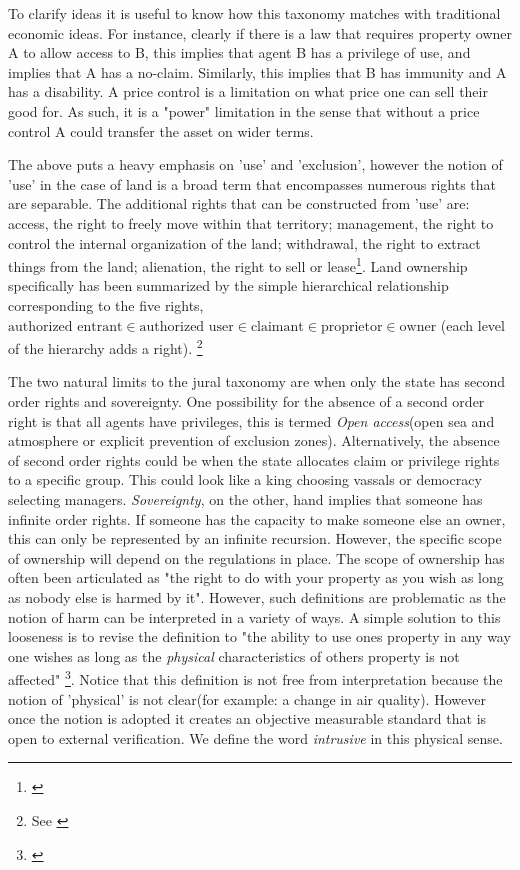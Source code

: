 To clarify ideas it is useful to know how this taxonomy matches with traditional economic ideas. For instance, clearly if there is a law that requires property owner A to allow access to B, this implies that agent B has a privilege of use, and implies that A has a no-claim. Similarly, this implies that B has immunity and A has a disability. A price control is a limitation on what price one can sell their good for. As such, it is a "power" limitation in the sense that without a price control A could transfer the asset on wider terms.

The above puts a heavy emphasis on 'use' and 'exclusion', however the notion of 'use' in the case of land is a broad term that encompasses numerous rights that are separable. The additional rights that can be constructed from 'use' are: access, the right to freely move within that territory; management, the right to control the internal organization of the land; withdrawal, the right to extract things from the land; alienation, the right to sell or lease\footnote{\cite{ostrom2010private}}.
Land ownership specifically has been summarized by the simple hierarchical relationship corresponding to the five rights, $\text{authorized entrant} \in \text{authorized user}  \in \text{claimant}  \in \text{proprietor} \in \text{owner}$ (each level of the hierarchy adds a right). \footnote{See \cite{schlager1992property}}


The two natural limits to the jural taxonomy are when only the state has second order rights and sovereignty. One possibility for the absence of a second order right is that all agents have privileges, this is termed \textit{Open access}(open sea and atmosphere or explicit prevention of exclusion zones). Alternatively, the absence of second order rights could be when the state allocates claim or privilege rights to a specific group. This could look like a king choosing vassals or democracy selecting managers. \textit{Sovereignty}, on the other, hand implies that someone has infinite order rights. If someone has the capacity to make someone else an owner, this can only be represented by an infinite recursion. However, the specific scope of ownership will depend on the regulations in place. The scope of ownership has often been articulated as "the right to do with your property as you wish as long as nobody else is harmed by it". However, such definitions are problematic as the notion of harm can be interpreted in a variety of ways. A simple solution to this looseness is to revise the definition to "the ability to use ones property in any way one wishes as long as the \textit{physical} characteristics of others property is not affected" \footnote{\cite{Alchian1965}}. Notice that this definition is not free from interpretation because the notion of 'physical' is not clear(for example: a change in air quality). However once the notion is adopted it creates an objective measurable standard that is open to external verification. We define the word \textit{intrusive} in this physical sense.


